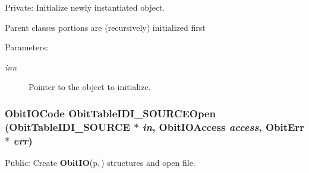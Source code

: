 Private: Initialize newly instantiated object. 

Parent classes portions are (recursively) initialized first \begin{Desc}
\item[Parameters:]
\begin{description}
\item[{\em inn}]Pointer to the object to initialize. \end{description}
\end{Desc}
\subsubsection{\setlength{\rightskip}{0pt plus 5cm}Obit\-IOCode Obit\-Table\-IDI\_\-SOURCEOpen ({\bf Obit\-Table\-IDI\_\-SOURCE} $\ast$ {\em in}, Obit\-IOAccess {\em access}, {\bf Obit\-Err} $\ast$ {\em err})}\label{ObitTableIDI__SOURCE_8c_a21}


Public: Create {\bf Obit\-IO}{\rm (p.\,\pageref{structObitIO})} structures and open file. 

